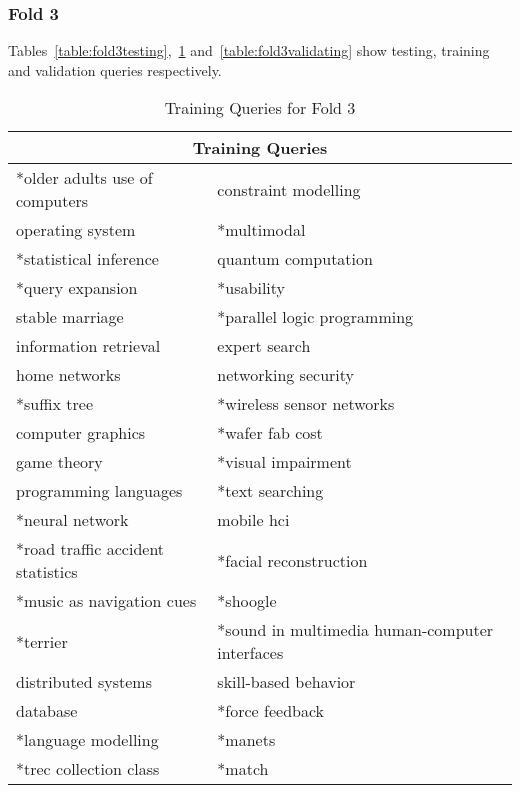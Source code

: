 \subsubsection{Fold 3}
Tables~\ref{table:fold3testing},~\ref{table:fold3training} and~\ref{table:fold3validating} show testing, training and validation queries respectively.
\begin{table}
\centering
\begin{tabular}{|l|l|}

\hline \multicolumn{2}{|c|}{\textbf{Training Queries}} \\
\hline *older adults use of computers & constraint modelling \\
\hline operating system & *multimodal \\
\hline *statistical inference & quantum computation \\
\hline *query expansion & *usability \\ 
\hline stable marriage & *parallel logic programming \\
\hline information retrieval & expert search \\ 
\hline home networks & networking security \\
\hline *suffix tree & *wireless sensor networks \\ 
\hline computer graphics & *wafer fab cost \\
\hline game theory & *visual impairment \\ 
\hline programming languages & *text searching \\
\hline *neural network & mobile hci \\ 
\hline *road traffic accident statistics & *facial reconstruction \\
\hline *music as navigation cues & *shoogle \\
\hline *terrier & *sound in multimedia human-computer interfaces \\
\hline distributed systems & skill-based behavior \\
\hline database & *force feedback \\
\hline *language modelling & *manets \\
\hline *trec collection class & *match \\
\hline
\end{tabular}
\caption{Training Queries for Fold 3} \label{table:fold3training}
\end{table}

